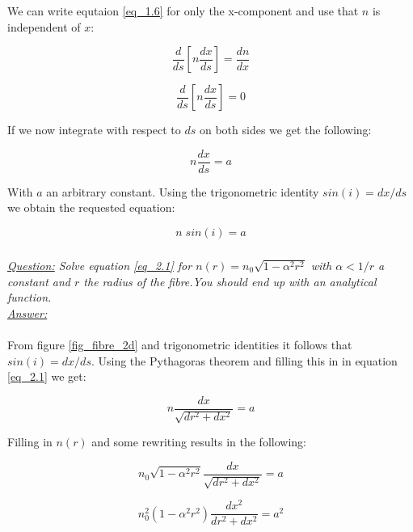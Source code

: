 \documentclass{article}
\begin{document}
We can write equtaion \ref{eq_1.6} for only the x-component and use that $n$ is independent of $x$:

\begin{equation}
	\frac{d}{ds} \left[ n \frac{d x}{ds} \right] = \frac{d n}{dx}
\end{equation}

\begin{equation}
	\frac{d}{ds} \left[ n \frac{d x}{ds} \right] = 0
\end{equation}

If we now integrate with respect to $ds$ on both sides we get the following:

\begin{equation}
	n \frac{d x}{ds} = a
\end{equation}

With $a$ an arbitrary constant. Using the trigonometric identity $sin(i)= dx/ds$ we obtain the requested equation:

\begin{equation}
	n \; sin(i) = a
\end{equation}

\subsubsection{}

\textit{\underline{Question:} Solve equation \ref{eq_2.1} for $n(r) = n_0 \sqrt{1 - \alpha ^2 r^2}$ with $\alpha < 1/r$ a constant and $r$ the radius of the fibre.You should end up with an analytical function.}
\\
\textit{\underline{Answer:}} \\
\\



From figure \ref{fig_fibre_2d} and trigonometric identities it follows that $ sin(i) = dx/ds$. Using the Pythagoras theorem and filling this in in equation \ref{eq_2.1} we get:

\begin{equation}
	n  \frac{dx}{\sqrt{dr^2 + dx^2}} = a
\end{equation}

Filling in $n(r)$ and some rewriting results in the following:

\begin{equation}
	n_0 \sqrt{1 - \alpha ^2 r^2}  \frac{dx}{\sqrt{dr^2 + dx^2}} = a
\end{equation}

\begin{equation}
	n_0^2 (1 - \alpha ^2 r^2)  \frac{dx^2}{dr^2 + dx^2} = a^2
\end{equation}
\end{document}
